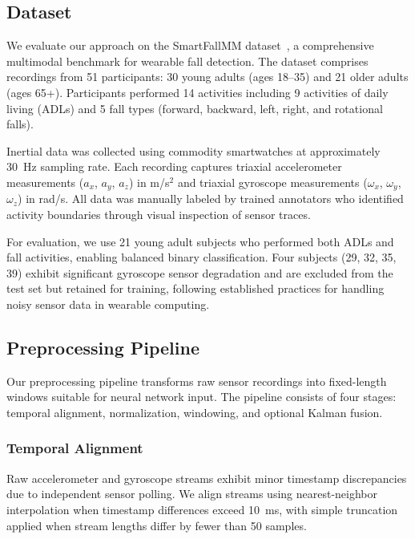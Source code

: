 
\subsection{Dataset}
\label{subsec:dataset}

We evaluate our approach on the SmartFallMM dataset~\cite{ngu2022personalized}, a comprehensive multimodal benchmark for wearable fall detection. The dataset comprises recordings from 51 participants: 30 young adults (ages 18--35) and 21 older adults (ages 65+). Participants performed 14 activities including 9 activities of daily living (ADLs) and 5 fall types (forward, backward, left, right, and rotational falls).

Inertial data was collected using commodity smartwatches at approximately 30~Hz sampling rate. Each recording captures triaxial accelerometer measurements ($a_x$, $a_y$, $a_z$) in m/s$^2$ and triaxial gyroscope measurements ($\omega_x$, $\omega_y$, $\omega_z$) in rad/s. All data was manually labeled by trained annotators who identified activity boundaries through visual inspection of sensor traces.

For evaluation, we use 21 young adult subjects who performed both ADLs and fall activities, enabling balanced binary classification. Four subjects (29, 32, 35, 39) exhibit significant gyroscope sensor degradation and are excluded from the test set but retained for training, following established practices for handling noisy sensor data in wearable computing.

\subsection{Preprocessing Pipeline}
\label{subsec:preprocessing}

Our preprocessing pipeline transforms raw sensor recordings into fixed-length windows suitable for neural network input. The pipeline consists of four stages: temporal alignment, normalization, windowing, and optional Kalman fusion.

\subsubsection{Temporal Alignment}
Raw accelerometer and gyroscope streams exhibit minor timestamp discrepancies due to independent sensor polling. We align streams using nearest-neighbor interpolation when timestamp differences exceed 10~ms, with simple truncation applied when stream lengths differ by fewer than 50 samples.

